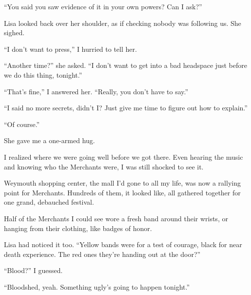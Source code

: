 ``You said you saw evidence of it in your own powers?  Can I ask?''



Lisa looked back over her shoulder, as if checking nobody was following us.  She sighed.



``I don't want to press,'' I hurried to tell her.



``Another time?'' she asked.  ``I don't want to get into a bad headspace just before we do this thing, tonight.''



``That's fine,'' I answered her.  ``Really, you don't have to say.''



``I said no more secrets, didn't I?  Just give me time to figure out how to explain.''



``Of course.''



She gave me a one-armed hug.



I realized where we were going well before we got there.  Even hearing the music and knowing who the Merchants were, I was still shocked to see it.



Weymouth shopping center, the mall I'd gone to all my life, was now a rallying point for Merchants.  Hundreds of them, it looked like, all gathered together for one grand, debauched festival.



Half of the Merchants I could see wore a fresh band around their wrists, or hanging from their clothing, like badges of honor.



Lisa had noticed it too.  ``Yellow bands were for a test of courage, black for near death experience.  The red ones they're handing out at the door?''



``Blood?'' I guessed.



``Bloodshed, yeah.  Something ugly's going to happen tonight.''





